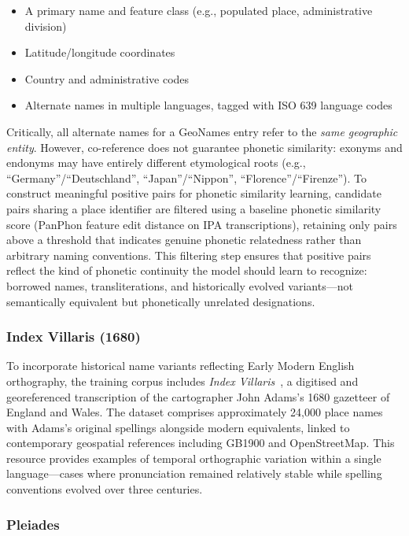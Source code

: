 \documentclass[11pt]{article}
\begin{document}
    \begin{itemize}
        \item A primary name and feature class (e.g., populated place, administrative division)
        \item Latitude/longitude coordinates
        \item Country and administrative codes
        \item Alternate names in multiple languages, tagged with ISO 639 language codes
    \end{itemize}

    Critically, all alternate names for a GeoNames entry refer to the \emph{same geographic entity}. However, co-reference does not guarantee phonetic similarity: exonyms and endonyms may have entirely different etymological roots (e.g., ``Germany''/``Deutschland'', ``Japan''/``Nippon'', ``Florence''/``Firenze''). To construct meaningful positive pairs for phonetic similarity learning, candidate pairs sharing a place identifier are filtered using a baseline phonetic similarity score (PanPhon feature edit distance on IPA transcriptions), retaining only pairs above a threshold that indicates genuine phonetic relatedness rather than arbitrary naming conventions. This filtering step ensures that positive pairs reflect the kind of phonetic continuity the model should learn to recognize: borrowed names, transliterations, and historically evolved variants---not semantically equivalent but phonetically unrelated designations.

    \subsubsection{Index Villaris (1680)}

    To incorporate historical name variants reflecting Early Modern English orthography, the training corpus includes \emph{Index Villaris}~\citep{indexvillaris2024}, a digitised and georeferenced transcription of the cartographer John Adams's 1680 gazetteer of England and Wales. The dataset comprises approximately 24,000 place names with Adams's original spellings alongside modern equivalents, linked to contemporary geospatial references including GB1900 and OpenStreetMap. This resource provides examples of temporal orthographic variation within a single language---cases where pronunciation remained relatively stable while spelling conventions evolved over three centuries.

    \subsubsection{Pleiades}
\end{document}
